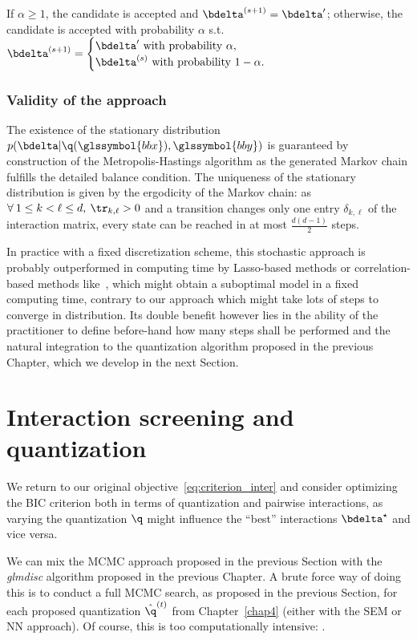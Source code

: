 If $\alpha \geq 1$, the candidate is accepted and $\bdelta^{(s+1)} = \bdelta'$; otherwise, the candidate is accepted with probability $\alpha$ s.t.\ $\bdelta^{(s+1)} = \begin{cases} \bdelta' \text{ with probability } \alpha, \\ \bdelta^{(s)} \text{ with probability } 1-\alpha. \end{cases}$

\subsubsection{Validity of the approach}


The existence of the stationary distribution $p(\bdelta | \q(\glssymbol{bbx}),\glssymbol{bby})$ is guaranteed by construction of the Metropolis-Hastings algorithm as the generated Markov chain fulfills the detailed balance condition. The uniqueness of the stationary distribution is given by the ergodicity of the Markov chain: as $\forall \: 1 \leq  k < \ell \leq d, \: \tr_{k,\ell} > 0$ and a transition changes only one entry $\delta_{k,\ell}$ of the interaction matrix, every state can be reached in at most $\frac{d(d-1)}{2}$ steps.

In practice with a fixed discretization scheme, this stochastic approach is probably outperformed in computing time by Lasso-based methods or correlation-based methods like~\cite{simon}, which might obtain a suboptimal model in a fixed computing time, contrary to our approach which might take lots of steps to converge in distribution. Its double benefit however lies in the ability of the practitioner to define before-hand how many steps shall be performed and the natural integration to the quantization algorithm proposed in the previous Chapter, which we develop in the next Section.

\section{Interaction screening and quantization}

We return to our original objective~\ref{eq:criterion_inter} and consider optimizing the BIC criterion both in terms of quantization and pairwise interactions, as varying the quantization $\q$ might influence the ``best'' interactions $\bdelta^\star$ and vice versa.

We can mix the MCMC approach proposed in the previous Section with the \textit{glmdisc} algorithm proposed in the previous Chapter. A brute force way of doing this is to conduct a full MCMC search, as proposed in the previous Section, for each proposed quantization $\hat{\q}^{(t)}$ from Chapter~\ref{chap4} (either with the SEM or NN approach). Of course, this is too computationally intensive: .


